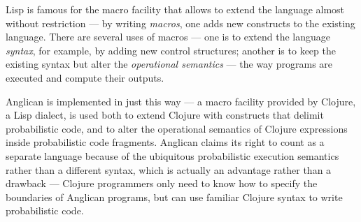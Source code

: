 \documentclass[sigconf]{acmart}
\begin{document}
\iftoggle{full}{%
There are several ways to build a programming language
on top of or besides another language.  The easiest is an
interpreter --- a program that reads a program, in its entirety
or line-by-line, and executes it by applying operational
semantics of a certain kind to the language. \textsc{Basic} is
famous for line-by-line interpreted implementations.

Another approach is to write a compiler, either to a virtual
architecture, so called p-code or byte-code, or to real
hardware. Here, the whole program is translated from the
`higher-level' source language to a `lower-level' object
language, which can be directly executed, either by hardware or
by an interpreter --- but the latter interpreter can be made
simpler and more efficient  than an interpreter for the source
language.

On top of these two approaches are methods in which a new
language is implemented `inside' another language of the same
level of abstraction. Different languages provide different
means for this; }{%
There are several ways to build a new language on top of an
existing one;
}%
Lisp is famous for the macro facility
that allows to extend the language almost without
restriction --- by writing \textit{macros}, one adds new
constructs to the existing language. There are several uses of
macros --- one is to extend the language \textit{syntax}, for
example, by adding new control structures; another is to keep
the existing syntax but alter the \textit{operational semantics}
--- the way programs are executed and compute their outputs.

Anglican is implemented in just this way --- a macro facility
provided by Clojure, a Lisp dialect, is used both to extend
Clojure with constructs that delimit probabilistic code, and to
alter the operational semantics of Clojure expressions inside
probabilistic code fragments. Anglican claims its right to count
as a separate language
because of the ubiquitous probabilistic
execution semantics rather than a different syntax,
which is actually an advantage rather than a drawback ---
Clojure programmers only need to know how to specify the
boundaries of Anglican programs, but can use familiar Clojure
syntax to write probabilistic code.
\end{document}
